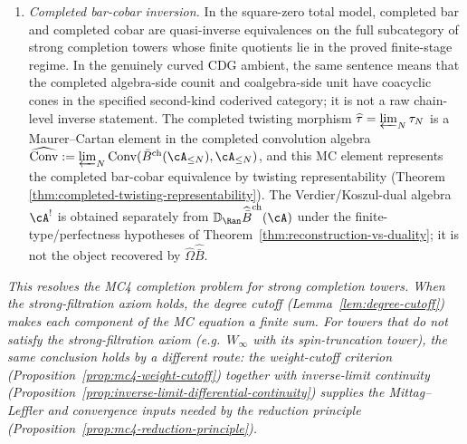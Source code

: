 \begin{theorem}
\begin{enumerate}
 quotient in the proved finite-stage regime, then the completed unit
 $\widehat\eta \colon C \to
 \widehat{\bar B}^{\mathrm{ch}}\bigl(
 \widehat\Omega^{\mathrm{ch}}(C)\bigr)$
 is a quasi-isomorphism when the completed total differential squares
 to zero; in a curved CDG ambient the corresponding assertion is that
 its cone is coacyclic in the specified second-kind category.
\item \emph{Completed bar-cobar inversion.}
 In the square-zero total model, completed bar and completed cobar
 are quasi-inverse equivalences on the full subcategory of strong
 completion towers whose finite quotients lie in the proved finite-stage
 regime. In the genuinely curved CDG ambient, the same sentence means
 that the completed algebra-side counit and coalgebra-side unit have
 coacyclic cones in the specified second-kind coderived category; it
 is not a raw chain-level inverse statement. The completed twisting
 morphism
 $\widehat\tau = \varprojlim_N \tau_N$ is a Maurer--Cartan
 element in the completed convolution algebra
 $\widehat{\operatorname{Conv}} :=
 \varprojlim_N \operatorname{Conv}(\bar B^{\mathrm{ch}}
 (\cA_{\le N}), \cA_{\le N})$,
 and this MC element represents the completed bar-cobar
 equivalence by twisting representability
 \textup{(}Theorem~\textup{%
 \ref{thm:completed-twisting-representability})}.
 The Verdier/Koszul-dual algebra $\cA^!$ is obtained separately
 from $\mathbb{D}_{\Ran}\widehat{\bar B}^{\mathrm{ch}}(\cA)$ under
 the finite-type/perfectness hypotheses of
 Theorem~\ref{thm:reconstruction-vs-duality}; it is not the object
 recovered by $\widehat\Omega\widehat{\bar B}$.
\end{enumerate}
\emph{This resolves the MC4 completion problem for strong completion
towers. When the strong-filtration axiom holds, the degree cutoff
\textup{(}Lemma~\textup{\ref{lem:degree-cutoff})} makes each
component of the MC equation a finite sum.
For towers that do not satisfy the strong-filtration axiom
\textup{(}e.g.\ $W_\infty$ with its spin-truncation tower\textup{)},
the same conclusion holds by a different route: the weight-cutoff
criterion \textup{(}Proposition~\textup{\ref{prop:mc4-weight-cutoff})}
together with inverse-limit continuity
\textup{(}Proposition~\textup{\ref{prop:inverse-limit-differential-continuity})}
supplies the Mittag--Leffler and convergence inputs needed by the
reduction principle
\textup{(}Proposition~\textup{\ref{prop:mc4-reduction-principle})}.}
\end{theorem}

